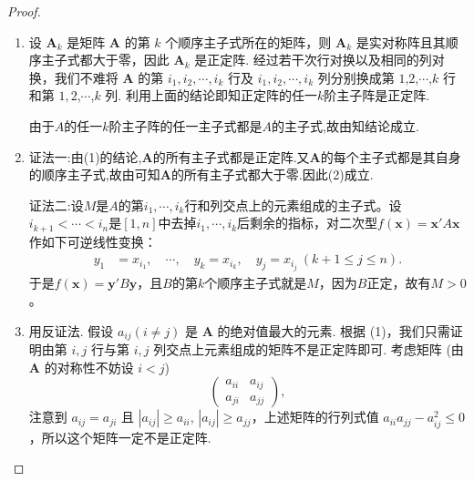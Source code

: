 \documentclass[../../main.tex]{subfiles}%
\begin{document}
\begin{proof}
\begin{enumerate}[(1)]
\item 设 $\boldsymbol{A}_k$ 是矩阵 $\boldsymbol{A}$ 的第 $k$ 个顺序主子式所在的矩阵，则 $\boldsymbol{A}_k$ 是实对称阵且其顺序主子式都大于零，因此 $\boldsymbol{A}_k$ 是正定阵.
经过若干次行对换以及相同的列对换，我们不难将 $\boldsymbol{A}$ 的第 $i_1,i_2,\cdots,i_k$ 行及 $i_1,i_2,\cdots,i_k$ 列分别换成第 $1$,$2$,$\cdots$,$k$ 行和第 $1,2$,$\cdots$,$k$ 列. 利用上面的结论即知正定阵的任一$k$阶主子阵是正定阵.

由于$A$的任一$k$阶主子阵的任一主子式都是$A$的主子式,故由知结论成立.

\item {\color{blue}证法一:}由(1)的结论,$\boldsymbol{A}$的所有主子式都是正定阵.又$\boldsymbol{A}$的每个主子式都是其自身的顺序主子式,故由可知$\boldsymbol{A}$的所有主子式都大于零.因此(2)成立.

{\color{blue}证法二:}设\(M\)是\(A\)的第\(i_1,\cdots,i_k\)行和列交点上的元素组成的主子式。设\(i_{k + 1}<\cdots < i_n\)是\([1,n]\)中去掉\(i_1,\cdots,i_k\)后剩余的指标，对二次型\(f(\boldsymbol{x})=\boldsymbol{x}'A\boldsymbol{x}\)作如下可逆线性变换：
\begin{align*}
y_1&=x_{i_1},\quad\cdots,\quad y_k = x_{i_k},\quad y_j = x_{i_j}\ (k + 1\leqslant  j\leqslant  n).
\end{align*}
于是\(f(\boldsymbol{x})=\boldsymbol{y}'B\boldsymbol{y}\)，且\(B\)的第\(k\)个顺序主子式就是\(M\)，因为\(B\)正定，故有\(M > 0\)。

\item 用反证法. 假设 $a_{ij}(i\neq j)$ 是 $\boldsymbol{A}$ 的绝对值最大的元素. 根据 (1)，我们只需证明由第 $i,j$ 行与第 $i,j$ 列交点上元素组成的矩阵不是正定阵即可. 考虑矩阵 (由 $\boldsymbol{A}$ 的对称性不妨设 $i < j$)
\[
\begin{pmatrix}
a_{ii} & a_{ij}\\
a_{ji} & a_{jj}
\end{pmatrix},
\]
注意到 $a_{ij} = a_{ji}$ 且 $|a_{ij}|\geqslant  a_{ii}$, $|a_{ij}|\geqslant  a_{jj}$，上述矩阵的行列式值 $a_{ii}a_{jj}-a_{ij}^2\leqslant  0$，所以这个矩阵一定不是正定阵. 
\end{enumerate}

\end{proof}
\end{document}
